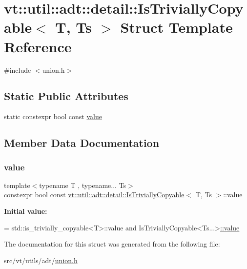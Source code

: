 \hypertarget{structvt_1_1util_1_1adt_1_1detail_1_1_is_trivially_copyable}{}\section{vt\+:\+:util\+:\+:adt\+:\+:detail\+:\+:Is\+Trivially\+Copyable$<$ T, Ts $>$ Struct Template Reference}
\label{structvt_1_1util_1_1adt_1_1detail_1_1_is_trivially_copyable}


{\ttfamily \#include $<$union.\+h$>$}

\subsection*{Static Public Attributes}
\begin{DoxyCompactItemize}
\item 
static constexpr bool const \hyperlink{structvt_1_1util_1_1adt_1_1detail_1_1_is_trivially_copyable_a5ea057aa710a0a78d62b17db1bd02b57}{value}
\end{DoxyCompactItemize}


\subsection{Member Data Documentation}
\mbox{\label{structvt_1_1util_1_1adt_1_1detail_1_1_is_trivially_copyable_a5ea057aa710a0a78d62b17db1bd02b57}} 
\subsubsection{\texorpdfstring{value}{value}}
{\footnotesize\ttfamily template$<$typename T , typename... Ts$>$ \\
constexpr bool const \hyperlink{structvt_1_1util_1_1adt_1_1detail_1_1_is_trivially_copyable}{vt\+::util\+::adt\+::detail\+::\+Is\+Trivially\+Copyable}$<$ T, Ts $>$\+::value\hspace{0.3cm}{\ttfamily [static]}}

{\bfseries Initial value\+:}
\begin{DoxyCode}
=
    std::is\_trivially\_copyable<T>::value and IsTriviallyCopyable<Ts...>\hyperlink{structvt_1_1util_1_1adt_1_1detail_1_1_is_trivially_copyable_a5ea057aa710a0a78d62b17db1bd02b57}{::value}
\end{DoxyCode}


The documentation for this struct was generated from the following file\+:\begin{DoxyCompactItemize}
\item 
src/vt/utils/adt/\hyperlink{union_8h}{union.\+h}\end{DoxyCompactItemize}
